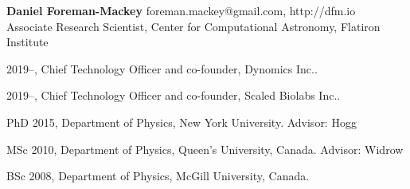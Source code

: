 \documentclass[12pt,letterpaper]{article}
\begin{document}
\thispagestyle{empty}\sloppy\sloppypar\raggedbottom

\textbf{\Large Daniel Foreman-Mackey} \hfill
\textsf{\small foreman.mackey@gmail.com, http://dfm.io} \\[0.5ex]
Associate Research Scientist, Center for Computational Astronomy, Flatiron Institute\\[0.5ex]

\begin{list}{}{\cvlist}
\item
2019--, Chief Technology Officer and co-founder, Dynomics Inc..
\item
2019--, Chief Technology Officer and co-founder, Scaled Biolabs Inc..
\item
PhD 2015, Department of Physics, New York University. Advisor: Hogg
\item
MSc 2010, Department of Physics, Queen's University, Canada. Advisor: Widrow
\item
BSc 2008, Department of Physics, McGill University, Canada.
\end{list}

\begin{list}{}{\cvlist}

\end{list}
\end{document}
